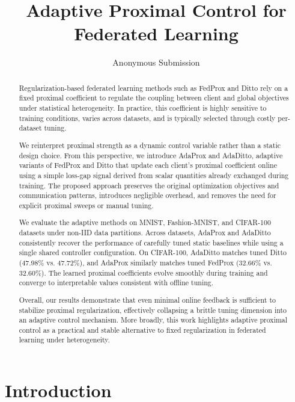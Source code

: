 \documentclass[letterpaper]{article} %
\title{Adaptive Proximal Control for Federated Learning}
\author{
    Anonymous Submission
}
\begin{document}
\maketitle

\begin{abstract}
Regularization-based federated learning methods such as FedProx and Ditto rely on a fixed proximal coefficient to regulate the coupling between client and global objectives under statistical heterogeneity. In practice, this coefficient is highly sensitive to training conditions, varies across datasets, and is typically selected through costly per-dataset tuning.

We reinterpret proximal strength as a dynamic control variable rather than a static design choice. From this perspective, we introduce AdaProx and AdaDitto, adaptive variants of FedProx and Ditto that update each client’s proximal coefficient online using a simple loss-gap signal derived from scalar quantities already exchanged during training. The proposed approach preserves the original optimization objectives and communication patterns, introduces negligible overhead, and removes the need for explicit proximal sweeps or manual tuning.

We evaluate the adaptive methods on MNIST, Fashion-MNIST, and CIFAR-100 datasets under non-IID data partitions. Across datasets, AdaProx and AdaDitto consistently recover the performance of carefully tuned static baselines while using a single shared controller configuration. On CIFAR-100, AdaDitto matches tuned Ditto (47.98\% vs. 47.72\%), and AdaProx similarly matches tuned FedProx (32.66\% vs. 32.60\%). The learned proximal coefficients evolve smoothly during training and converge to interpretable values consistent with offline tuning.

Overall, our results demonstrate that even minimal online feedback is sufficient to stabilize proximal regularization, effectively collapsing a brittle tuning dimension into an adaptive control mechanism. More broadly, this work highlights adaptive proximal control as a practical and stable alternative to fixed regularization in federated learning under heterogeneity.

\end{abstract}

\begin{links}
\end{links}

\section{Introduction}
\end{document}
